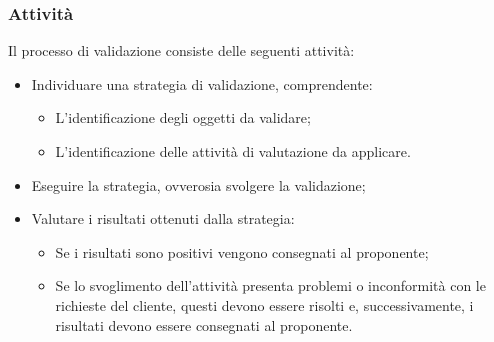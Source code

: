 \documentclass[../norme-di-progetto.tex]{subfiles}
\begin{document}
\subsubsection{Attività}
Il processo di validazione consiste delle seguenti attività:
\begin{itemize}
  \item Individuare una strategia di validazione, comprendente:
  \begin{itemize}
    \item L'identificazione degli oggetti da validare;
    \item L'identificazione delle attività di valutazione da applicare.
  \end{itemize}
  \item Eseguire la strategia, ovverosia svolgere la validazione;
  \item Valutare i risultati ottenuti dalla strategia:
  \begin{itemize}
    \item Se i risultati sono positivi vengono consegnati al proponente;
    \item Se lo svoglimento dell'attività presenta problemi o inconformità con le richieste del cliente, questi devono essere risolti e, successivamente, i risultati devono essere consegnati al proponente.
  \end{itemize}
\end{itemize}
\end{document}
